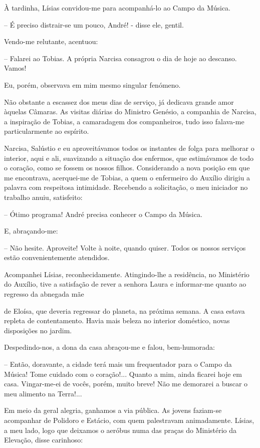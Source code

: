 \documentclass[portuguese,12pt,a4paper]{scrbook}
\begin{document}
	À tardinha, Lísias convidou-me para acompanhá-lo ao Campo da Música.
	
	– É preciso distrair-se um pouco, André! - disse ele, gentil.
	
	Vendo-me relutante, acentuou:
	
	– Falarei ao Tobias. A própria Narcisa consagrou o dia de hoje ao descanso. Vamos!
	
	Eu, porém, observava em mim mesmo singular fenómeno.
	
	Não obstante a escassez dos meus dias de serviço, já dedicava grande amor àquelas Câmaras. As visitas diárias do Ministro Genésio, a companhia de Narcisa, a inspiração de Tobias, a camaradagem dos companheiros, tudo isso falava-me particularmente ao espírito.
	
	Narcisa, Salústio e eu aproveitávamos todos os instantes de folga para melhorar o interior, aqui e ali, suavizando a situação dos enfermos, que estimávamos de todo o coração, como se fossem os nossos filhos. Considerando a nova posição em que me encontrava, acerquei-me de Tobias, a quem o enfermeiro do Auxílio dirigiu a palavra com respeitosa intimidade. Recebendo a solicitação, o meu iniciador no trabalho anuiu, satisfeito:
	
	– Ótimo programa! André precisa conhecer o Campo da Música.
	
	E, abraçando-me:
	
	– Não hesite. Aproveite! Volte à noite, quando quiser. Todos os nossos serviços estão convenientemente atendidos.
	
	Acompanhei Lísias, reconhecidamente. Atingindo-lhe a residência, no Ministério do Auxílio, tive a satisfação de rever a senhora Laura e informar-me quanto ao regresso da abnegada mãe
	
	
	de Eloísa, que deveria regressar do planeta, na próxima semana. A casa estava repleta de contentamento. Havia mais beleza no interior doméstico, novas disposições no jardim.
	
	Despedindo-nos, a dona da casa abraçou-me e falou, bem-humorada:
	
	– Então, doravante, a cidade terá mais um frequentador para o Campo da Música! Tome cuidado com o coração!... Quanto a mim, ainda ficarei hoje em casa. Vingar-me-ei de vocês, porém, muito breve! Não me demorarei a buscar o meu alimento na Terra!...
	
	Em meio da geral alegria, ganhamos a via pública. As jovens faziam-se acompanhar de Polidoro e Estácio, com quem palestravam animadamente. Lísias, a meu lado, logo que deixamos o aeróbus numa das praças do Ministério da Elevação, disse carinhoso:
	
\end{document}

